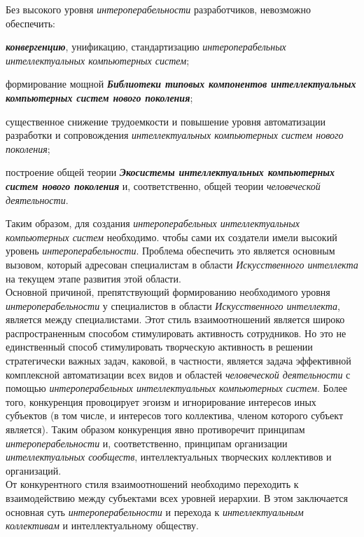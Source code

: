 \begin{textitemize}
	Без высокого уровня \textit{интероперабельности} разработчиков, невозможно обеспечить:
	\begin{textitemize}
		\item \textbf{\textit{конвергенцию}}, унификацию, стандартизацию \textit{интероперабельных интеллектуальных компьютерных систем};
		\item формирование мощной \textbf{\textit{Библиотеки типовых компонентов интеллектуальных компьютерных систем нового поколения}};
		\item существенное снижение трудоемкости и повышение уровня автоматизации разработки и сопровождения \textit{интеллектуальных компьютерных систем  нового поколения};
		\item построение общей теории \textbf{\textit{Экосистемы интеллектуальных компьютерных систем нового поколения}} и, соответственно, общей теории \textit{человеческой деятельности}.
	\end{textitemize}

		Таким образом, для создания \textit{интероперабельных интеллектуальных компьютерных систем} необходимо. чтобы сами их создатели имели высокий уровень \textit{интероперабельности}. Проблема обеспечить это является основным вызовом, который адресован специалистам в области \textit{Искусственного интеллекта} на текущем этапе развития этой области.\\
		Основной причиной, препятствующий формированию необходимого уровня \textit{интероперабельности} у специалистов в области \textit{Искусственного интеллекта}, является  между специалистами. Этот стиль взаимоотношений является широко распространенным способом стимулировать активность сотрудников. Но это не единственный способ стимулировать творческую активность в решении стратегически важных задач, каковой, в частности, является задача эффективной комплексной автоматизации всех видов и областей \textit{человеческой деятельности} с помощью \textit{интероперабельных интеллектуальных компьютерных систем}. Более того, конкуренция провоцирует эгоизм и игнорирование интересов иных субъектов (в том числе, и интересов того коллектива, членом которого субъект является). Таким образом конкуренция явно противоречит принципам \textit{интероперабельности} и, соответственно, принципам организации \textit{интеллектуальных сообществ}, интеллектуальных творческих коллективов и организаций.\\
		От конкурентного стиля взаимоотношений необходимо переходить к  взаимодействию между субъектами всех уровней иерархии. В этом заключается основная суть \textit{интероперабельности} и перехода к \textit{интеллектуальным коллективам} и интеллектуальному обществу.
	\end{textitemize}

